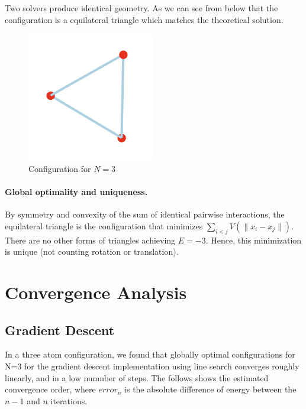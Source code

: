 \documentclass[11pt,onecolumn]{article}
\begin{document}
Two solvers produce identical geometry. As we can see from below that the configuration is a equilateral triangle which matches the theoretical solution.
\begin{figure}[h]
  \centering
  \includegraphics[width=0.5\textwidth]{N3.png}
  \caption{Configuration for $N=3$}
\end{figure}

\paragraph{Global optimality and uniqueness.}  
By symmetry and convexity of the sum of identical pairwise interactions, the equilateral triangle is the configuration that minimizes \(\sum_{i<j}V(\|x_i-x_j\|)\).  There are no other forms of triangles achieving \(E=-3\).  Hence, this minimization is unique (not counting rotation or translation).

\newpage
\section{Convergence Analysis}
\subsection{Gradient Descent}

In a three atom configuration, we found that globally optimal configurations for N=3 for the gradient descent implementation using line search converges roughly linearly, and in a low numnber of steps. The follows shows the estimated convergence order, where $error_{n}$ is the absolute difference of energy between the $n-1$ and $n$ iterations. 
\end{document}
